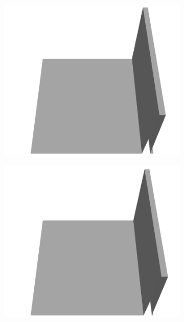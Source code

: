 \documentclass[../document.tex]{subfiles}
\begin{document}
\begin{figure}[H]
\begin{subfigure}[b]{0.065\textwidth}
    \includegraphics[width=\linewidth]{../img/5/custom_patches/walls_front/all/05-3d.png}
    \end{subfigure}
    \begin{subfigure}[b]{0.065\textwidth}
    \includegraphics[width=\linewidth]{../img/5/custom_patches/walls_front/all/04-3d.png}
    \end{subfigure}
    \begin{subfigure}[b]{0.065\textwidth}

\end{subfigure}
\end{figure}
\end{document}
